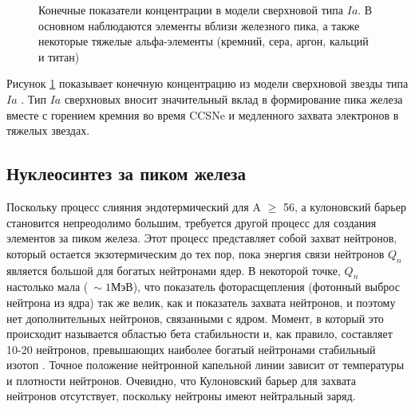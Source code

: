 \documentclass[14pt, a4paper]{article}
\numberwithin{figure}{section}
\numberwithin{equation}{section}
\begin{document}
\begin{figure}[ht]
	\caption{Конечные показатели концентрации в модели сверхновой типа $Ia$. В основном наблюдаются элементы вблизи железного пика, а также некоторые тяжелые альфа-элементы (кремний, сера, аргон, кальций и титан)}
	\label{ris:iron-abu}
\end{figure}

Рисунок \ref{ris:iron-abu} показывает конечную концентрацию из модели сверхновой звезды типа $Ia$ \cite{iron-abu}. Тип $Ia$ сверхновых вносит значительный вклад в формирование пика железа вместе с горением кремния во время CCSNe и медленного захвата электронов в тяжелых звездах.

\subsection{Нуклеосинтез за пиком железа}
Поскольку процесс слияния эндотермический для A $\ge$ 56, а кулоновский барьер становится непреодолимо большим, требуется другой процесс для создания элементов за пиком железа. Этот процесс представляет собой захват нейтронов, который остается экзотермическим до тех пор, пока энергия связи нейтронов $Q_n$ является большой для богатых нейтронами ядер. В некоторой точке, $Q_n$ настолько мала ($~\sim1 \text{МэВ}$), что показатель фоторасщепления (фотонный выброс нейтрона из ядра) так же велик, как и показатель захвата нейтронов, и поэтому нет дополнительных нейтронов, связанными с ядром. Момент, в который это происходит называется областью бета стабильности и, как правило, составляет 10-20 нейтронов, превышающих наиболее богатый нейтронами стабильный изотоп \cite{cauldrons}. Точное положение нейтронной капельной линии зависит от температуры и плотности нейтронов. Очевидно, что Кулоновский барьер  для захвата нейтронов отсутствует, поскольку нейтроны имеют нейтральный заряд.
\end{document}
